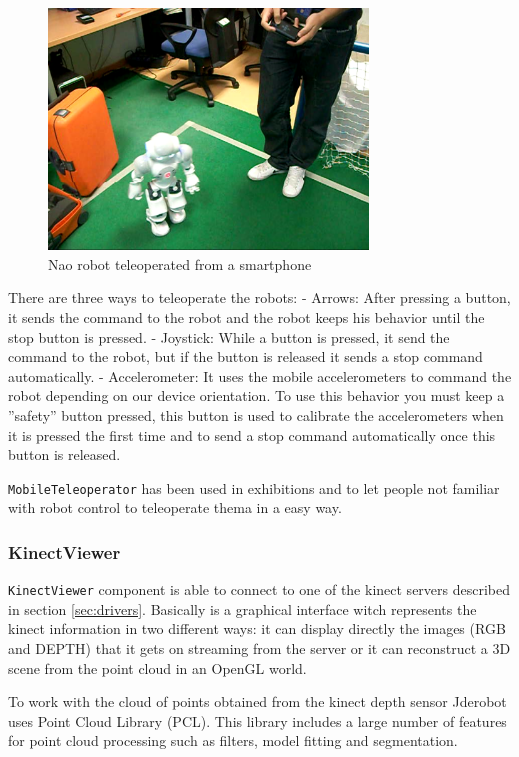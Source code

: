 \documentclass[twocolumn]{svjour3}          %
\begin{document}
\begin{figure}[h!]
  \includegraphics[width=8.5cm]{figs/teleoperator-nao.png}
\caption{Nao robot teleoperated from a smartphone}
\label{fig:nao-teleoperator}
\end{figure}

There are three ways to teleoperate the robots:
- Arrows: After pressing a button, it sends the command to the robot and the robot keeps his behavior until the stop button is pressed.
- Joystick: While a button is pressed, it send the command to the robot, but if the button is released it sends a stop command automatically.
- Accelerometer: It uses the mobile accelerometers to command the robot depending on our device orientation. To use this behavior you must keep a ''safety'' button pressed, this button is used to calibrate the accelerometers when it is pressed the first time and to send a stop command automatically once this button is released.

\texttt{MobileTeleoperator} has been used in exhibitions and to let people not familiar with robot control to teleoperate thema in a easy way.

\subsubsection{KinectViewer}

\texttt{KinectViewer} component is able to connect to one of the kinect servers described in section \ref{sec:drivers}. Basically is a graphical interface witch represents the kinect information in two different ways: it can display directly the images (RGB and DEPTH) that it gets on streaming from the server or it can reconstruct a 3D scene from the point cloud in an OpenGL world. 

To work with the cloud of points obtained from the kinect depth sensor Jderobot uses Point Cloud Library (PCL). This library includes a large number of features for point cloud processing such as filters, model fitting and segmentation. 
\end{document}
